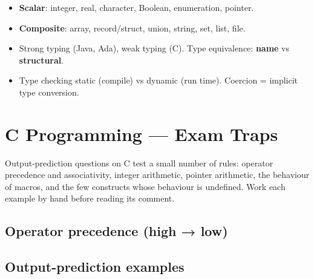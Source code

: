 \begin{itemize}
\tightlist
\item
  \textbf{Scalar}: integer, real, character, Boolean, enumeration, pointer.
\item
  \textbf{Composite}: array, record/struct, union, string, set, list, file.
\item
  Strong typing (Java, Ada), weak typing (C). Type equivalence: \textbf{name} vs \textbf{structural}.
\item
  Type checking static (compile) vs dynamic (run time). Coercion = implicit type conversion.
\end{itemize}

\needspace{161pt}

\hypertarget{p2-03--2-c-programming--exam-traps}{%
\section{C Programming --- Exam Traps}\label{p2-03--2-c-programming--exam-traps}}

Output-prediction questions on C test a small number of rules: operator precedence and associativity,
integer arithmetic, pointer arithmetic, the behaviour of macros, and the few constructs whose behaviour is
undefined. Work each example by hand before reading its comment.

\needspace{95pt}

\hypertarget{p2-03--21-operator-precedence-high--low}{%
\subsection{Operator precedence (high → low)}\label{p2-03--21-operator-precedence-high--low}}



\needspace{332pt}

\hypertarget{p2-03--22-output-prediction-examples}{%
\subsection{Output-prediction examples}\label{p2-03--22-output-prediction-examples}}

